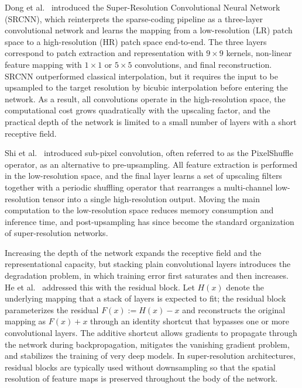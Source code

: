 Dong et al.~\cite{dong2014learning} introduced the Super-Resolution Convolutional Neural Network (SRCNN), which reinterprets the sparse-coding pipeline as a three-layer convolutional network and learns the mapping from a low-resolution (LR) patch space to a high-resolution (HR) patch space end-to-end. The three layers correspond to patch extraction and representation with $9 \times 9$ kernels, non-linear feature mapping with $1 \times 1$ or $5 \times 5$ convolutions, and final reconstruction. SRCNN outperformed classical interpolation, but it requires the input to be upsampled to the target resolution by bicubic interpolation before entering the network. As a result, all convolutions operate in the high-resolution space, the computational cost grows quadratically with the upscaling factor, and the practical depth of the network is limited to a small number of layers with a short receptive field.

Shi et al.~\cite{shi2016real} introduced sub-pixel convolution, often referred to as the PixelShuffle operator, as an alternative to pre-upsampling. All feature extraction is performed in the low-resolution space, and the final layer learns a set of upscaling filters together with a periodic shuffling operator that rearranges a multi-channel low-resolution tensor into a single high-resolution output. Moving the main computation to the low-resolution space reduces memory consumption and inference time, and post-upsampling has since become the standard organization of super-resolution networks.

Increasing the depth of the network expands the receptive field and the representational capacity, but stacking plain convolutional layers introduces the degradation problem, in which training error first saturates and then increases. He et al.~\cite{he2016deep} addressed this with the residual block. Let $H(x)$ denote the underlying mapping that a stack of layers is expected to fit; the residual block parameterizes the residual $F(x) := H(x) - x$ and reconstructs the original mapping as $F(x) + x$ through an identity shortcut that bypasses one or more convolutional layers. The additive shortcut allows gradients to propagate through the network during backpropagation, mitigates the vanishing gradient problem, and stabilizes the training of very deep models. In super-resolution architectures, residual blocks are typically used without downsampling so that the spatial resolution of feature maps is preserved throughout the body of the network.

